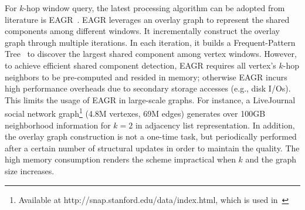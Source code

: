 For $k$-hop window query, 
the latest processing algorithm can be adopted from literature is EAGR~\cite{mondal2014eagr}.
%
EAGR leverages an overlay graph to represent the shared
components among different windows. It incrementally construct the overlay graph
through multiple iterations. In each iteration, it builds a Frequent-Pattern Tree~\cite{han2004mining}
to discover the largest shared component among vertex windows. However,
to achieve efficient shared component detection, EAGR requires all
vertex's $k$-hop neighbors to be pre-computed and resided in memory; otherwise
EAGR incurs high performance overheads due to secondary storage accesses (e.g., disk I/Os).
This limits the usage of EAGR in large-scale graphs. 
For instance, a LiveJournal social network graph\footnote{Available at http://snap.stanford.edu/data/index.html, which is used in~\cite{mondal2014eagr}} 
(4.8M vertexes, 69M edges) generates over 100GB neighborhood information 
for $k=2$ in adjacency list representation. 
In addition, the overlay graph construction is not a one-time task,
but periodically performed after a certain number of structural updates 
in order to maintain the quality. 
The high memory consumption renders the scheme impractical when $k$ and the graph size increases.


